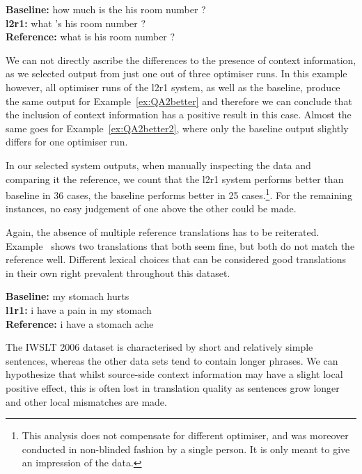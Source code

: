 \begin{exe}
\footnotesize
\ex \textbf{Baseline:} how much is the his room number ?  \\
\textbf{l2r1:} what 's his room number ?  \\
\textbf{Reference:} what is his room number ?
\label{ex:QA2better2}
\end{exe}

We can not directly ascribe the differences to the presence of context
information, as we selected output from just one out of three optimiser runs.
In this example however, all optimiser runs of the l2r1 system, as well as the
baseline, produce the same output for Example~\ref{ex:QA2better} and therefore
we can conclude that the inclusion of context information has a positive result
in this case. Almost the same goes for Example~\ref{ex:QA2better2}, where only
the baseline output slightly differs for one optimiser run.

In our selected system outputs, when manually inspecting the data and comparing
it the reference, we count that the l2r1 system performs better than baseline
in 36 cases, the baseline performs better in 25 cases.\footnote{This analysis
does not compensate for different optimiser, and was moreover conducted in
non-blinded fashion by a single person. It is only meant to give an impression
of the data.}. For the remaining instances, no easy judgement of one above the
other could be made.

Again, the absence of multiple reference translations has to be reiterated.
Example~\label{ex:QA2allnice} shows two translations that both seem fine, but
both do not match the reference well. Different lexical choices that can be
considered good translations in their own right prevalent throughout this
dataset.

\begin{exe}
\footnotesize
\ex \textbf{Baseline:} my stomach hurts  \\
\textbf{l1r1:} i have a pain in my stomach \\
\textbf{Reference:} i have a stomach ache
\label{ex:QA2allnice}
\end{exe}

The IWSLT 2006 dataset is characterised by short and relatively simple
sentences, whereas the other data sets tend to contain longer phrases. We can
hypothesize that whilst source-side context information may have a slight local
positive effect, this is often lost in translation quality as sentences grow
longer and other local mismatches are made.

